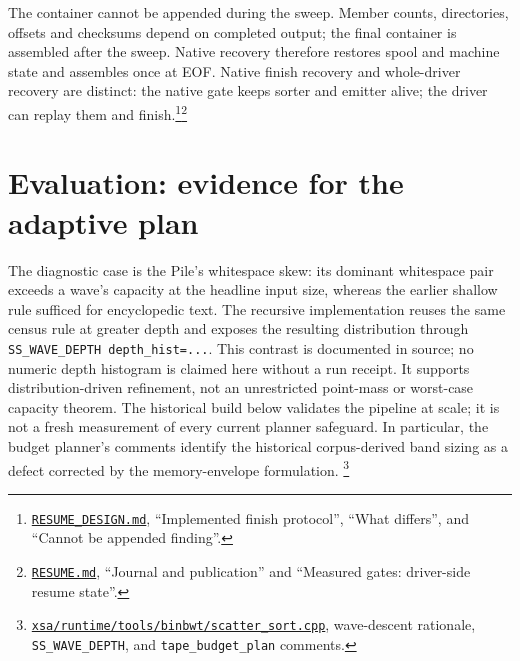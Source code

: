 \documentclass[10pt]{article}
\newcommand{\ev}[2]{\footnote{\href{https://github.com/pangenome/sxgc/blob/c46a85217b9b269c91179cbebc396f96453181af/#1}{\nolinkurl{#1}}, #2.}}
\begin{document}
The container cannot be appended during the sweep. Member counts, directories, offsets and checksums
depend on completed output; the final container is assembled after the sweep. Native recovery
therefore restores spool and machine state and assembles once at EOF. Native finish recovery and
whole-driver recovery are distinct: the native gate keeps sorter and emitter alive; the driver can
replay them and finish.\ev{RESUME_DESIGN.md}{``Implemented finish protocol'', ``What differs'', and
``Cannot be appended finding''}\ev{RESUME.md}{``Journal and publication'' and ``Measured gates:
driver-side resume state''}

\section{Evaluation: evidence for the adaptive plan}
The diagnostic case is the Pile's whitespace skew: its dominant whitespace pair exceeds a
wave's capacity at the headline input size, whereas the earlier shallow rule sufficed for
encyclopedic text. The recursive implementation reuses the same census rule at greater depth
and exposes the resulting distribution through \texttt{SS\_WAVE\_DEPTH depth\_hist=...}.
This contrast is documented in source; no numeric depth histogram is claimed here without a
run receipt. It supports distribution-driven refinement, not an unrestricted point-mass or
worst-case capacity theorem. The historical build below validates the pipeline at scale;
it is not a fresh measurement of every current planner safeguard. In particular, the budget
planner's comments identify the historical corpus-derived band sizing as a defect corrected
by the memory-envelope formulation.
\ev{xsa/runtime/tools/binbwt/scatter_sort.cpp}{wave-descent rationale,
\texttt{SS\_WAVE\_DEPTH}, and \texttt{tape\_budget\_plan} comments}
\end{document}
